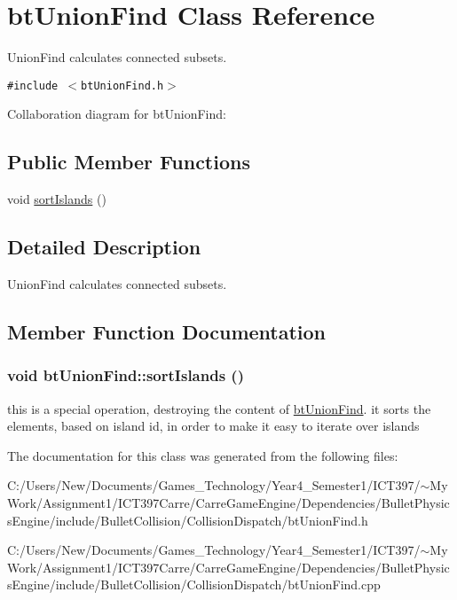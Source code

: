\hypertarget{classbt_union_find}{
\section{btUnionFind Class Reference}
\label{classbt_union_find}
}
UnionFind calculates connected subsets.  


{\tt \#include $<$btUnionFind.h$>$}

Collaboration diagram for btUnionFind:\subsection*{Public Member Functions}
\begin{CompactItemize}
\item 
void \hyperlink{classbt_union_find_8bf4647f84d20b033e0d0a7188f3b798}{sortIslands} ()
\end{CompactItemize}


\subsection{Detailed Description}
UnionFind calculates connected subsets. 

\subsection{Member Function Documentation}
\hypertarget{classbt_union_find_8bf4647f84d20b033e0d0a7188f3b798}{
\subsubsection[sortIslands]{\setlength{\rightskip}{0pt plus 5cm}void btUnionFind::sortIslands ()}}
\label{classbt_union_find_8bf4647f84d20b033e0d0a7188f3b798}


this is a special operation, destroying the content of \hyperlink{classbt_union_find}{btUnionFind}. it sorts the elements, based on island id, in order to make it easy to iterate over islands 

The documentation for this class was generated from the following files:\begin{CompactItemize}
\item 
C:/Users/New/Documents/Games\_\-Technology/Year4\_\-Semester1/ICT397/$\sim$My Work/Assignment1/ICT397Carre/CarreGameEngine/Dependencies/BulletPhysicsEngine/include/BulletCollision/CollisionDispatch/btUnionFind.h\item 
C:/Users/New/Documents/Games\_\-Technology/Year4\_\-Semester1/ICT397/$\sim$My Work/Assignment1/ICT397Carre/CarreGameEngine/Dependencies/BulletPhysicsEngine/include/BulletCollision/CollisionDispatch/btUnionFind.cpp\end{CompactItemize}
